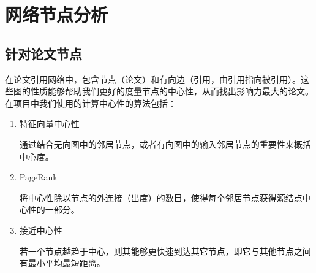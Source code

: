 \documentclass{bmvc2k}
\begin{document}

\section{网络节点分析}
\subsection{针对论文节点}
在论文引用网络中，包含节点（论文）和有向边（引用，由引用指向被引用）。这些图的性质能够帮助我们更好的度量节点的中心性，从而找出影响力最大的论文。
在项目中我们使用的计算中心性的算法包括：
\begin{enumerate}
\item 特征向量中心性

通过结合无向图中的邻居节点，或者有向图中的输入邻居节点的重要性来概括中心度。
\item PageRank

将中心性除以节点的外连接（出度）的数目，使得每个邻居节点获得源结点中心性的一部分。
\item 接近中心性

若一个节点越趋于中心，则其能够更快速到达其它节点，即它与其他节点之间有最小平均最短距离。
\end{enumerate}
\end{document}
